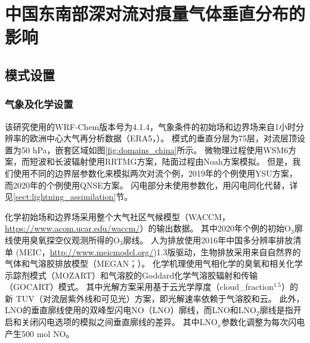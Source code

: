 
\chapter{中国东南部深对流对痕量气体垂直分布的影响}

\section{模式设置}

\subsection{气象及化学设置}

该研究使用的WRF-Chem版本号为4.1.4，气象条件的初始场和边界场来自1小时分辨率的欧洲中心大气再分析数据（ERA5，\citet{Hersbach.2020}）。
模式的垂直分层为75层，对流层顶设置为50 hPa，嵌套区域如图\ref{fig:domains_china}所示。
微物理过程使用WSM6方案\citep{Hong.2006a}，而短波和长波辐射使用RRTMG方案\citep{Iacono.2008}，陆面过程由Noah方案模拟\citep{Koren.1999}。
但是，我们使用不同的边界层参数化来模拟两次对流个例，2019年的个例使用YSU方案\citep{Hong.2006}，而2020年的个例使用QNSE方案\citep{Sukoriansky.2005}。
闪电部分未使用参数化，用闪电同化代替，详见\ref{sect:lightning_assimilation}节。

化学初始场和边界场采用整个大气社区气候模型（WACCM，\url{https://www.acom.ucar.edu/waccm/}）的输出数据。
其中2020年个例的初始O$_3$廓线使用臭氧探空仪观测所得的O$_3$廓线。
人为排放使用2016年中国多分辨率排放清单 (MEIC，\url{http://www.meicmodel.org/})1.3版驱动，生物排放采用来自自然界的气体和气溶胶排放模型（MEGAN；\citet{Guenther.2006}）。
化学机理使用气相化学的臭氧和相关化学示踪剂模式（MOZART）和气溶胶的Goddard化学气溶胶辐射和传输（GOCART）模式\citep{Pfister.2011}。
其中光解方案采用基于云光学厚度（cloud\_fraction$^{1.5}$）的新 TUV（对流层紫外线和可见光）方案，即光解速率依赖于气溶胶和云。
此外，LNO的垂直廓线使用\citet{Ott.2010}的双峰型闪电NO（LNO）廓线\citep{Laughner.2017}，而LNO和LNO$_2$廓线是指开启和关闭闪电选项的模拟之间垂直廓线的差异。
其中LNO$_x$参数化调整为每次闪电产生500 mol NO\citep{Zhu.2019}。

